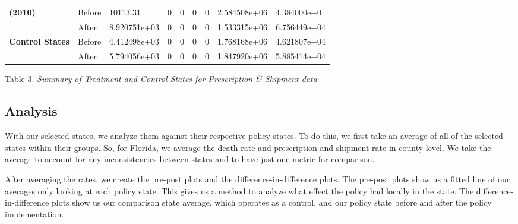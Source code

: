 \documentclass{article}
\begin{document}
\begin{longtable}[]{@{}lllllllll@{}}
\begin{minipage}[t]{0.08\columnwidth}
\textbf{(2010)}\strut
\end{minipage} & \begin{minipage}[t]{0.08\columnwidth}\raggedright
Before\strut
\end{minipage} & \begin{minipage}[t]{0.08\columnwidth}\raggedright
10113.31\strut
\end{minipage} & \begin{minipage}[t]{0.08\columnwidth}\raggedright
0\strut
\end{minipage} & \begin{minipage}[t]{0.08\columnwidth}\raggedright
0\strut
\end{minipage} & \begin{minipage}[t]{0.08\columnwidth}\raggedright
0\strut
\end{minipage} & \begin{minipage}[t]{0.08\columnwidth}\raggedright
0\strut
\end{minipage} & \begin{minipage}[t]{0.08\columnwidth}\raggedright
2.584508e+06\strut
\end{minipage} & \begin{minipage}[t]{0.08\columnwidth}\raggedright
4.384000e+0\strut
\end{minipage}\tabularnewline
& After & 8.920751e+03 & 0 & 0 & 0 & 0 & 1.533315e+06 &
6.756449e+04\tabularnewline
\textbf{Control States} & Before & 4.412498e+03 & 0 & 0 & 0 & 0 &
1.768168e+06 & 4.621807e+04\tabularnewline
& After & 5.794056e+03 & 0 & 0 & 0 & 0 & 1.847920e+06 &
5.885414e+04\tabularnewline
\bottomrule
\end{longtable}

Table 3. \emph{Summary of Treatment and Control States for Prescription
\& Shipment data}

\hypertarget{analysis}{%
\subsection{\texorpdfstring{Analysis }{Analysis }}\label{analysis}}

With our selected states, we analyze them against their respective
policy states. To do this, we first take an average of all of the
selected states within their groups. So, for Florida, we average the
death rate and prescription and shipment rate in county level. We take
the average to account for any inconsistencies between states and to
have just one metric for comparison.

After averaging the rates, we create the pre-post plots and the
difference-in-difference plots. The pre-post plots show us a fitted line
of our averages only looking at each policy state. This gives us a
method to analyze what effect the policy had locally in the state. The
difference-in-difference plots show us our comparison state average,
which operates as a control, and our policy state before and after the
policy implementation.
\end{document}
